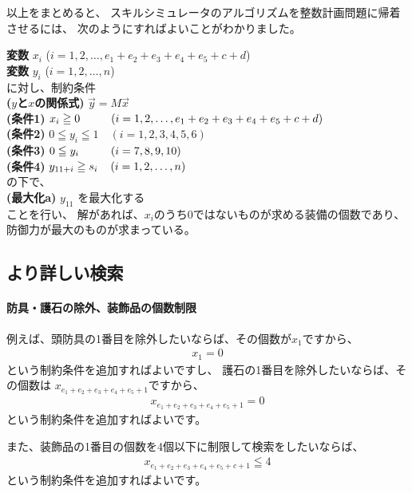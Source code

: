 \documentclass{jsarticle}
\begin{document}
以上をまとめると、
スキルシミュレータのアルゴリズムを整数計画問題に帰着させるには、
次のようにすればよいことがわかりました。
%
\begin{mdframed}
\hfil
\begin{minipage}{0.8\textwidth}
{\bf 変数} $x_i$ ($i=1,2,\ldots,e_1+e_2+e_3+e_4+e_5+c+d$) \\
{\bf 変数} $y_i$ ($i=1,2,\ldots,n$) \\
に対し、制約条件\\
{\bf ($y$と$x$の関係式)}
$\overrightarrow{y} = M \overrightarrow{x}$
\\
{\bf (条件1)}
$x_i \geqq 0 \hspace{9.8mm} (i = 1,2,\ldots, e_1+e_2+e_3+e_4+e_5+c+d)$
\\
{\bf (条件2)}
$ 0 \leqq y_i \leqq 1 \quad (i = 1,2,3,4,5,6)$
\\
{\bf (条件3)}
$ 0 \leqq y_i \hspace{10mm} (i = 7,8,9,10)  $
\\
{\bf (条件4)}
 $y_{11+i} \geqq s_i \hspace{4mm} (i = 1,2,\ldots, n)$
\\
の下で、\\
{\bf (最大化a)}
 $y_{11}$ を最大化する
\\
ことを行い、
解があれば、$x_i$のうち0ではないものが求める装備の個数であり、
防御力が最大のものが求まっている。
\end{minipage}
\end{mdframed}

\subsection{より詳しい検索} \label{subsec:kuwashii-kensaku}
\paragraph{防具・護石の除外、装飾品の個数制限}
例えば、頭防具の1番目を除外したいならば、その個数が$x_1$ですから、
\begin{align*}
x_1 = 0 
\tag{防具の除外}
\end{align*}
という制約条件を追加すればよいですし、
護石の1番目を除外したいならば、その個数は
$x_{e_1+e_2+e_3+e_4+e_5+1}$ですから、
\begin{align*}
x_{e_1+e_2+e_3+e_4+e_5+1} = 0 
\tag{護石の除外}
\end{align*}
という制約条件を追加すればよいです。

また、装飾品の1番目の個数を4個以下に制限して検索をしたいならば、
\begin{align*}
x_{e_1+e_2+e_3+e_4+e_5+c+1} \leqq 4
\tag{装飾品の個数制限}
\end{align*}
という制約条件を追加すればよいです。
\end{document}
